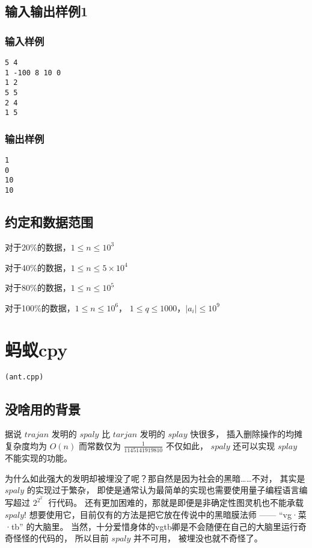 \documentclass[UTF8]{ctexart}
\begin{document}
\subsection{输入输出样例1}

\subsubsection{输入样例}

\begin{lstlisting}
5 4
1 -100 8 10 0
1 2
5 5
2 4
1 5
\end{lstlisting}

\subsubsection{输出样例}

\begin{lstlisting}
1
0
10
10
\end{lstlisting}


\subsection{约定和数据范围}

对于20\%的数据，$1\le n \le 10^3$

对于40\%的数据，$1\le n \le 5\times 10^4$

对于80\%的数据，$1\le n \le 10^5$

对于100\%的数据，$1\le n \le 10^6$， $1\le q\le 1000$，$|a_i| \le 10^9$

\newpage
\section{蚂蚁cpy}
\begin{center}
\tt\large{(ant.cpp)}
\end{center}

\subsection{没啥用的背景}

据说 $trajan$ 发明的 $spaly$ 比 $tarjan$ 发明的 $splay$ 快很多， 插入删除操作的均摊复杂度均为 $O(n)$ 而常数仅为 $\frac{1}{1145141919810}$ 不仅如此， $spaly$ 还可以实现 $splay$ 不能实现的功能。

为什么如此强大的发明却被埋没了呢？那自然是因为社会的黑暗……不对， 其实是 $spaly$ 的实现过于繁杂， 即使是通常认为最简单的实现也需要使用量子编程语言编写超过 $2^{2^{2^{\cdots}}}$ 行代码。 还有更加困难的，那就是即便是非确定性图灵机也不能承载 $spaly$! 想要使用它，目前仅有的方法是把它放在传说中的黑暗膜法师 —— “vg·菜·tb” 的大脑里。 当然，十分爱惜身体的vgtb卿是不会随便在自己的大脑里运行奇奇怪怪的代码的， 所以目前 $spaly$ 并不可用， 被埋没也就不奇怪了。
\end{document}
